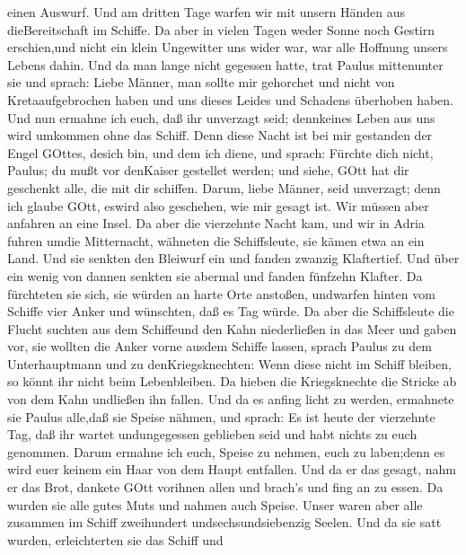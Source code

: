 einen Auswurf.  Und am dritten Tage warfen wir mit unsern
Händen aus dieBereitschaft im Schiffe.  Da aber in vielen
Tagen weder Sonne noch Gestirn erschien,und nicht ein klein Ungewitter
uns wider war, war alle Hoffnung unsers Lebens dahin.  Und
da man lange nicht gegessen hatte, trat Paulus mittenunter sie und
sprach: Liebe Männer, man sollte mir gehorchet und nicht von
Kretaaufgebrochen haben und uns dieses Leides und Schadens überhoben
haben.  Und nun ermahne ich euch, daß ihr unverzagt seid;
dennkeines Leben aus uns wird umkommen ohne das Schiff. 
Denn diese Nacht ist bei mir gestanden der Engel GOttes, desich bin, und
dem ich diene,  und sprach: Fürchte dich nicht, Paulus; du
mußt vor denKaiser gestellet werden; und siehe, GOtt hat dir geschenkt
alle, die mit dir schiffen.  Darum, liebe Männer, seid
unverzagt; denn ich glaube GOtt, eswird also geschehen, wie mir gesagt
ist.  Wir müssen aber anfahren an eine Insel. 
Da aber die vierzehnte Nacht kam, und wir in Adria fuhren umdie
Mitternacht, wähneten die Schiffsleute, sie kämen etwa an ein Land.
 Und sie senkten den Bleiwurf ein und fanden zwanzig
Klaftertief. Und über ein wenig von dannen senkten sie abermal und
fanden fünfzehn Klafter.  Da fürchteten sie sich, sie
würden an harte Orte anstoßen, undwarfen hinten vom Schiffe vier Anker
und wünschten, daß es Tag würde.  Da aber die Schiffsleute
die Flucht suchten aus dem Schiffeund den Kahn niederließen in das Meer
und gaben vor, sie wollten die Anker vorne ausdem Schiffe lassen,
 sprach Paulus zu dem Unterhauptmann und zu
denKriegsknechten: Wenn diese nicht im Schiff bleiben, so könnt ihr
nicht beim Lebenbleiben.  Da hieben die Kriegsknechte die
Stricke ab von dem Kahn undließen ihn fallen.  Und da es
anfing licht zu werden, ermahnete sie Paulus alle,daß sie Speise nähmen,
und sprach: Es ist heute der vierzehnte Tag, daß ihr wartet
undungegessen geblieben seid und habt nichts zu euch genommen.
 Darum ermahne ich euch, Speise zu nehmen, euch zu
laben;denn es wird euer keinem ein Haar von dem Haupt entfallen.
 Und da er das gesagt, nahm er das Brot, dankete GOtt
vorihnen allen und brach's und fing an zu essen.  Da wurden
sie alle gutes Muts und nahmen auch Speise.  Unser waren
aber alle zusammen im Schiff zweihundert undsechsundsiebenzig Seelen.
 Und da sie satt wurden, erleichterten sie das Schiff und
